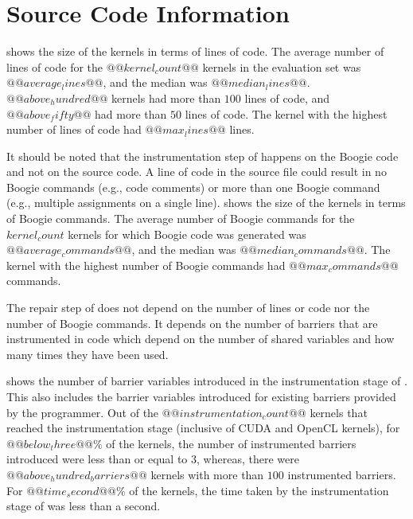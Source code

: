 \section{Source Code Information}

 shows the size of the kernels in terms of lines of code. The average number of lines of code for the $@@kernel_count@@$ kernels in the evaluation set was $@@average_lines@@$, and the median was $@@median_lines@@$. $@@above_hundred@@$ kernels had more than $100$ lines of code, and $@@above_fifty@@$ had more than $50$ lines of code. The kernel with the highest number of lines of code had $@@max_lines@@$ lines.



It should be noted that the instrumentation step of \tool happens on the Boogie code and not on the source code. A line of code in the source file could result in no Boogie commands (e.g., code comments) or more than one Boogie command (e.g., multiple assignments on a single line).  shows the size of the kernels in terms of Boogie commands. The average number of Boogie commands for the $kernel_count$ kernels for which Boogie code was generated was $@@average_commands@@$, and the median was $@@median_commands@@$. The kernel with the highest number of Boogie commands had $@@max_commands@@$ commands.



The repair step of \tool does not depend on the number of lines or code nor the number of Boogie commands. It depends on the number of barriers that are instrumented in code which depend on the number of shared variables and how many times they have been used.

 shows the number of barrier variables introduced in the instrumentation stage of \tool. This also includes the barrier variables introduced for existing barriers provided by the programmer. Out of the $@@instrumentation_count@@$ kernels that reached the instrumentation stage (inclusive of CUDA and OpenCL kernels), for $@@below_three@@\%$ of the kernels, the number of instrumented barriers introduced were less than or equal to $3$, whereas, there were $@@above_hundred_barriers@@$ kernels with more than $100$ instrumented barriers. For $@@time_second@@\%$ of the kernels, the time taken by the instrumentation stage of \tool was less than a second.
